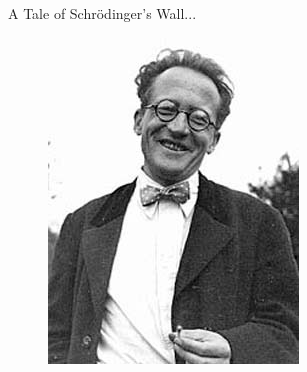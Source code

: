 \documentclass{beamer}
\begin{document}
\begin{frame}{A Tale of Schr\"{o}dinger's Wall...}
  \begin{figure}
    \centering
    \includegraphics[height=\textheight]{schrodinger.jpg}
  \end{figure}
\end{frame}
\end{document}
